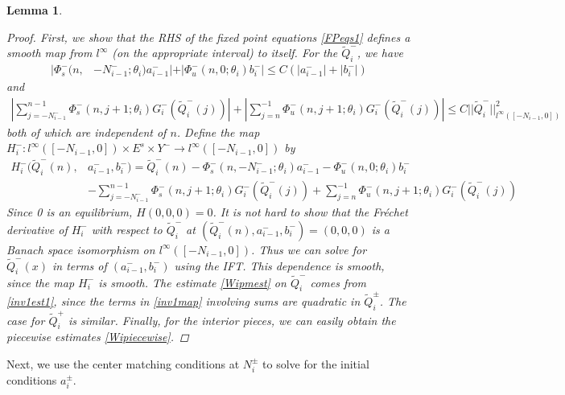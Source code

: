 \documentclass[12pt]{article}
\newtheorem{lemma}{Lemma}
\begin{document}
\begin{lemma}
\begin{proof}
First, we show that the RHS of the fixed point equations \eqref{FPeqs1} defines a smooth map from $l^\infty$ (on the appropriate interval) to itself. For the $\tilde{Q}_i^-$, we have
\begin{align}\label{inv1est1}
|\Phi_s^-(n, &-N_{i-1}^-; \theta_i) a_{i-1}^-| + |\Phi_u^-(n, 0; \theta_i) b_i^-| \leq C ( |a_{i-1}^-| + |b_i^-|) 
\end{align}
and
\begin{align*}
\left| \sum_{j = -N_{i-1}^-}^{n-1} \Phi_s^-(n, j+1; \theta_i) G_i^-(\tilde{Q}_i^-(j))\right| + \left|\sum_{j = n}^{-1} \Phi_u^-(n, j+1; \theta_i) G_i^-(\tilde{Q}_i^-(j))\right| 
\leq C ||\tilde{Q}_i^-||_{l^\infty([-N_{i-1}, 0])}^2 
\end{align*}
both of which are independent of $n$. Define the map $H_i^-: l^\infty([-N_{i-1}, 0]) \times E^s \times Y^- \rightarrow l^\infty([-N_{i-1}, 0])$ by
\begin{align}\label{inv1map}
H_i^-(\tilde{Q}_i^-(n), &a_{i-1}^-, b_i^-) = \tilde{Q}_i^-(n) - \Phi_s^-(n, -N_{i-1}^-; \theta_i) a_{i-1}^- - \Phi_u^-(n, 0; \theta_i) b_i^-  \\
&- \sum_{j = -N_{i-1}^-}^{n-1} \Phi_s^-(n, j+1; \theta_i) G_i^-(\tilde{Q}_i^-(j)) + \sum_{j = n}^{-1} \Phi_u^-(n, j+1; \theta_i) G_i^-(\tilde{Q}_i^-(j)) \nonumber
\end{align}
Since 0 is an equilibrium, $H(0, 0, 0) = 0$. It is not hard to show that the Fr\'echet derivative of $H_i^-$ with respect to $\tilde{Q}_i^-$ at $(\tilde{Q}_i^-(n), a_{i-1}^-, b_i^-) = (0, 0, 0)$ is a Banach space isomorphism on $l^\infty([-N_{i-1}, 0])$. Thus we can solve for $\tilde{Q}_i^-(x)$ in terms of $(a_{i-1}^-, b_i^-)$ using the IFT. This dependence is smooth, since the map $H_i^-$ is smooth. The estimate \eqref{Wipmest} on $\tilde{Q}_i^-$ comes from \eqref{inv1est1}, since the terms in \eqref{inv1map} involving sums are quadratic in $\tilde{Q}_i^\pm$. The case for $\tilde{Q}_i^+$ is similar. Finally, for the interior pieces, we can easily obtain the piecewise estimates \eqref{Wipiecewise}.
\end{proof}
\end{lemma}

Next, we use the center matching conditions at $N_i^\pm$ to solve for the initial conditions $a_i^\pm$.
\end{document}
